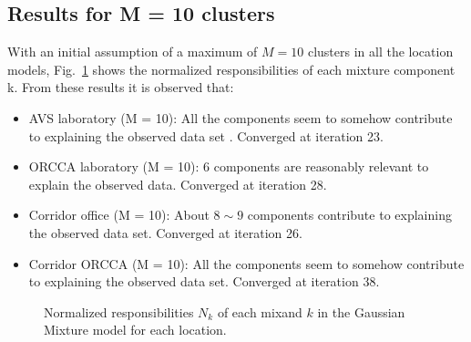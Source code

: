 \subsection{Results for M = 10 clusters}
With an initial assumption of a  maximum of $M=10$ clusters in all the location models, 
Fig.~\ref{fig:Responsibilities} shows the normalized responsibilities of each mixture component k. 
From these results it is observed that: 
\begin{itemize}
	\item{AVS laboratory (M = 10): }
	All the components seem to somehow contribute to explaining the observed data set . 
	Converged at iteration 23.
	\item{ORCCA laboratory (M = 10): }
	$6$ components are reasonably relevant to explain the observed data. 
	Converged at iteration 28.
	\item{Corridor office (M = 10): }
	About $8\sim9$ components contribute to explaining the observed data set.
	Converged at iteration 26.
	\item{Corridor ORCCA (M = 10): }
	All the components seem to somehow contribute to explaining the observed data set. 
	Converged at iteration 38.
\end{itemize}
\begin{figure}[!h]
	\centering
	\caption{Normalized responsibilities $N_k$ of each mixand $k$ in the Gaussian Mixture model for each location.}
	\label{fig:Responsibilities}
\end{figure}


